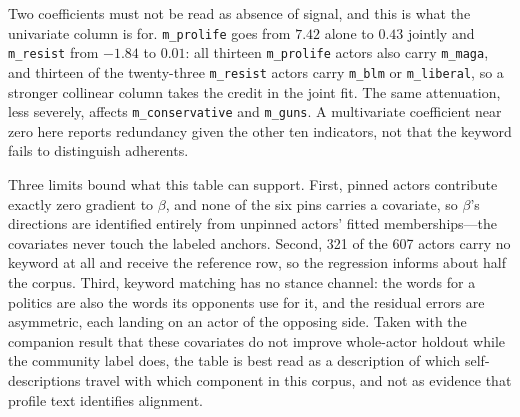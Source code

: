 Two coefficients must not be read as absence of signal, and this is what the univariate
column is for. \texttt{m\_prolife} goes from $7.42$ alone to $0.43$ jointly and
\texttt{m\_resist} from $-1.84$ to $0.01$: all thirteen \texttt{m\_prolife} actors also
carry \texttt{m\_maga}, and thirteen of the twenty-three \texttt{m\_resist} actors carry
\texttt{m\_blm} or \texttt{m\_liberal}, so a stronger collinear column takes the credit in
the joint fit. The same attenuation, less severely, affects \texttt{m\_conservative} and
\texttt{m\_guns}. A multivariate coefficient near zero here reports redundancy given the
other ten indicators, not that the keyword fails to distinguish adherents.

Three limits bound what this table can support. First, pinned actors contribute exactly
zero gradient to $\beta$, and none of the six pins carries a covariate, so $\beta$'s
directions are identified entirely from unpinned actors' fitted memberships---the
covariates never touch the labeled anchors. Second, 321 of the 607 actors carry no
keyword at all and receive the reference row, so the regression informs about half the
corpus. Third, keyword matching has no stance channel: the words for a politics are also
the words its opponents use for it, and the residual errors are asymmetric, each landing
on an actor of the opposing side. Taken with the companion result that these covariates
do not improve whole-actor holdout while the community label does, the table is best read
as a description of which self-descriptions travel with which component in this corpus,
and not as evidence that profile text identifies alignment.
